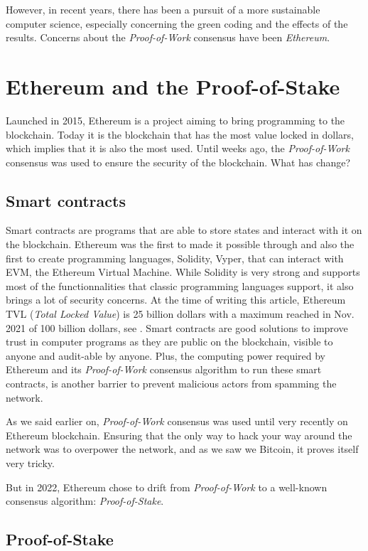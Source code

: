 \documentclass{ifacconf}
\begin{document}
However, in recent years, there has been a pursuit of a more sustainable computer science, especially concerning the green coding and the effects of the results. Concerns about the \textit{Proof-of-Work} consensus have been \textit{Ethereum}.

\section{Ethereum and the Proof-of-Stake}

Launched in 2015, Ethereum is a project aiming to bring programming to the blockchain. Today it is the blockchain that has the most value locked in dollars, which implies that it is also the most used. Until weeks ago, the \textit{Proof-of-Work} consensus was used to ensure the security of the blockchain. What has change?

\subsection{Smart contracts}
Smart contracts are programs that are able to store states and interact with it on the blockchain. Ethereum was the first to made it possible through and also the first to create programming languages, Solidity, Vyper, that can interact with EVM, the Ethereum Virtual Machine. While Solidity is very strong and supports most of the functionnalities that classic programming languages support, it also brings a lot of security concerns. At the time of writing this article, Ethereum TVL (\textit{Total Locked Value}) is 25 billion dollars with a maximum reached in Nov. 2021 of 100 billion dollars, see \citep[reference.][]{DefiLlama:22}. Smart contracts are good solutions to improve trust in computer programs as they are public on the blockchain, visible to anyone and audit-able by anyone. Plus, the computing power required by Ethereum and its \textit{Proof-of-Work} consensus algorithm to run these smart contracts, is another barrier to prevent malicious actors from spamming the network.

As we said earlier on, \textit{Proof-of-Work} consensus was used until very recently on Ethereum blockchain. Ensuring that the only way to hack your way around the network was to overpower the network, and as we saw we Bitcoin, it proves itself very tricky. 

But in 2022, Ethereum chose to drift from \textit{Proof-of-Work} to a  well-known consensus algorithm: \textit{Proof-of-Stake}.

\subsection{Proof-of-Stake}
\end{document}
